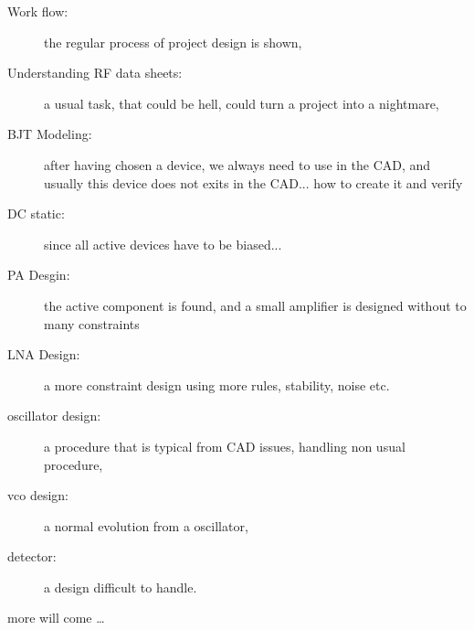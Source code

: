 \begin{description}
\item[Work flow: ] the regular process of project design is shown,

\item[Understanding RF data sheets: ] a usual task, that could be
hell, could turn a project into a nightmare,

\item[BJT Modeling: ] after having chosen a device, we always need to
use in the CAD, and usually this device does not exits in the
CAD... how to create it and verify

\item[DC static: ] since all active devices have to be biased...

\item[PA Desgin: ] the active component is found, and a small
amplifier is designed without to many constraints

\item[LNA Design: ] a more constraint design using more rules,
stability, noise etc.

\item[oscillator design: ] a procedure that is typical from CAD
issues, handling non usual procedure,

\item[vco design: ] a normal evolution from a oscillator,

\item[detector: ] a design difficult to handle.

\item[more will come \ldots]

\end{description}
